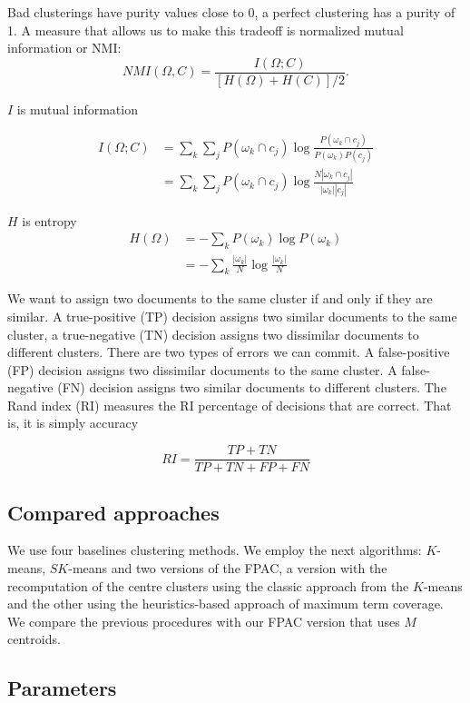 \documentclass[runningheads]{llncs}
\begin{document}
Bad clusterings
have purity values close to 0, a perfect clustering has a purity of 1.
A measure that allows us to make this tradeoff is normalized mutual information or NMI:
\[
NMI(\Omega, C) = \frac{I(\Omega; C)}{[H(\Omega) + H(C)] / 2}.
\]

$I$ is mutual information

\[
\begin{split}
I(\Omega; C) &= \sum_k\sum_j P(\omega_k \cap c_j)\log\frac{P(\omega_k \cap c_j)}{P(\omega_k)P(c_j)}\\
&= \sum_k\sum_j P(\omega_k \cap c_j)\log\frac{N|\omega_k \cap c_j|}{|\omega_k||c_j|}
\end{split}
\]

$H$ is entropy
\[
\begin{split}
H(\Omega) &= - \sum_k P(\omega_k) \log P(\omega_k)\\
&= - \sum_k \frac{|\omega_k|}{N} \log \frac{|\omega_k|}{N}
\end{split}
\]


We want to assign two documents to the same
cluster if and only if they are similar. A true-positive (TP) decision assigns
two similar documents to the same cluster, a true-negative (TN) decision assigns
two dissimilar documents to different clusters. There are two types of
errors we can commit. A false-positive (FP) decision assigns two dissimilar
documents to the same cluster. A false-negative (FN) decision assigns two
similar documents to different clusters. The Rand index (RI) measures the RI
percentage of decisions that are correct. That is, it is simply accuracy

\[
RI = \frac{TP + TN}{TP + TN + FP + FN}
\]


\subsection{Compared approaches}


We use four baselines clustering methods. We employ the next algorithms: 
$K$-means, $SK$-means and two versions of the FPAC, a version with
the recomputation of the centre clusters using the classic approach from
the $K$-means and the other using the heuristics-based approach of maximum
term coverage. We compare the previous procedures with our FPAC version
that uses $M$ centroids.

\subsection{Parameters}
\end{document}

